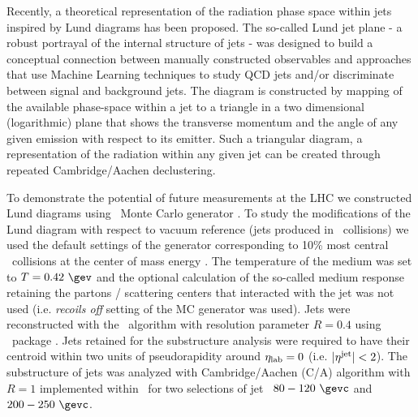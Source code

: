 Recently, a theoretical representation of the radiation phase space within jets inspired by Lund diagrams \cite{Andersson:1988gp} has been proposed. The so-called Lund jet plane \cite{Dreyer:2018nbf} - a robust portrayal of the internal structure of jets - was designed to build a conceptual connection between manually constructed observables and approaches that use Machine Learning techniques to study QCD jets and/or discriminate between signal and background jets.
The diagram is constructed by mapping of the available phase-space within a jet to a triangle in a two dimensional (logarithmic) plane that shows the transverse momentum and the angle of any given emission with respect to its emitter.
Such a triangular diagram, a representation of the radiation within any given jet can be created through repeated Cambridge/Aachen declustering.

To demonstrate the potential of future measurements at the LHC we constructed Lund diagrams using \jewel\ Monte Carlo generator \cite{Zapp:2013vla}.
To study the modifications of the Lund diagram with respect to vacuum reference (jets produced in \pp\ collisions) we used the default settings of the generator corresponding to 10\% most central \PbPb\ collisions at the center of mass energy .
The temperature of the medium was set to $T=0.42~\gev$ and the optional calculation of the so-called medium response retaining the partons / scattering centers that interacted with the jet was not used (i.e. {\it recoils off} setting of the MC generator was used).
Jets were reconstructed with the \akt\ algorithm \cite{Cacciari:2008gp} with resolution parameter $R=0.4$ using \fastjet\ package \cite{Cacciari:2011ma,Cacciari:2005hq}.
Jets retained for the substructure analysis were required to have their centroid within two units of pseudorapidity around $\eta_{\rm lab}=0$ (i.e. $|\eta^{\rm jet}| < 2$).
The substructure of jets was analyzed with Cambridge/Aachen (C/A) algorithm with $R=1$ implemented within \fastjet\ for two selections of jet \pt\ $80-120~\gevc$ and $200-250~\gevc$.

